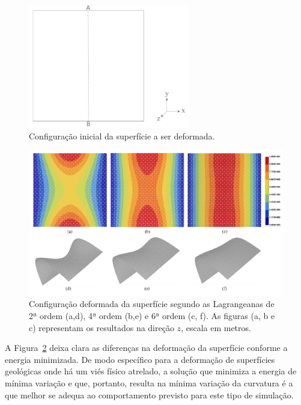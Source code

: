 \begin{figure} [H]
  \begin{center}
    \includegraphics[width=200pt]{images/fig-eg-surf-deformer-1}
    \caption{Configuração inicial da superfície a ser deformada.\cite{Muller}}\label{fig-eg-surf-deformer-1}
  \end{center}
\end{figure}


\begin{figure} [H]
  \begin{center}
    \includegraphics[width=\textwidth]{images/fig-eg-surf-deformer-2}
    \caption{Configuração deformada da superfície segundo as Lagrangeanas de 2ª ordem (a,d), 4ª ordem (b,e) e 6ª ordem (c, f). As figuras (a, b e c) representam os resultados na direção $z$, escala em metros.\cite{Muller}}\label{fig-eg-surf-deformer-2}
  \end{center}
\end{figure}

A Figura~\ref{fig-eg-surf-deformer-2} deixa clara as diferenças na deformação da superfície conforme a energia minimizada. De modo específico para a deformação de superfícies geológicas onde há um viés físico atrelado, a solução que minimiza a energia de mínima variação e que, portanto, resulta na mínima variação da curvatura é a que melhor se adequa ao comportamento previsto para este tipo de simulação.

